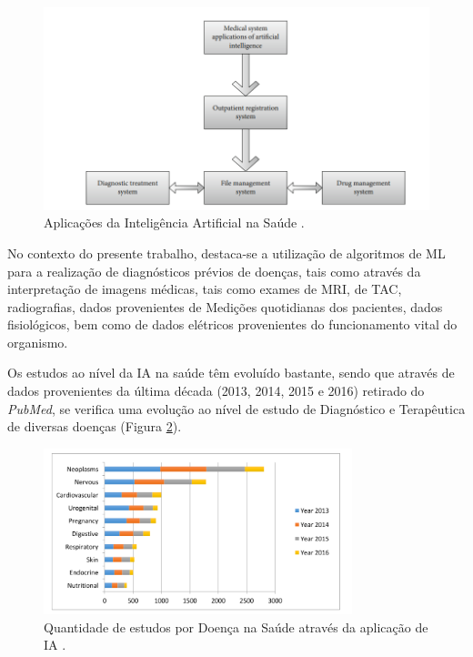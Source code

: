 \documentclass[12pt,a4paper,twoside]{report}
\begin{document}
{\begin{figure}[H]
    \centering
    \includegraphics[width=1\textwidth]{imagens/iaSaúde.png}
    \caption{Aplicações da Inteligência Artificial na Saúde \cite{iasaude}.}
    \label{fig:iasaude}
\end{figure}

No contexto do presente trabalho, destaca-se a utilização de algoritmos de \gls{ML} para a realização de diagnósticos prévios de doenças, tais como através da interpretação de imagens médicas, tais como exames de \gls{MRI}, de \Gls{TAC}, radiografias, dados provenientes de Medições quotidianas dos pacientes, dados fisiológicos, bem como de dados elétricos provenientes do funcionamento vital do organismo.

Os estudos ao nível da \gls{IA} na saúde têm evoluído bastante, sendo que através de dados provenientes da última década (2013, 2014, 2015 e 2016) retirado do \textit{PubMed}, se verifica uma evolução ao nível de estudo de Diagnóstico e Terapêutica de diversas doenças (Figura \ref{fig:iasaudedoenças}).

\begin{figure}[H]
    \centering
    \includegraphics[width=0.8\textwidth]{imagens/iaSaúdeDoenças.png}
    \caption{Quantidade de estudos por Doença na Saúde através da aplicação de \gls{IA} \cite{Jiang230}.}
    \label{fig:iasaudedoenças}
\end{figure}

}
\end{document}
